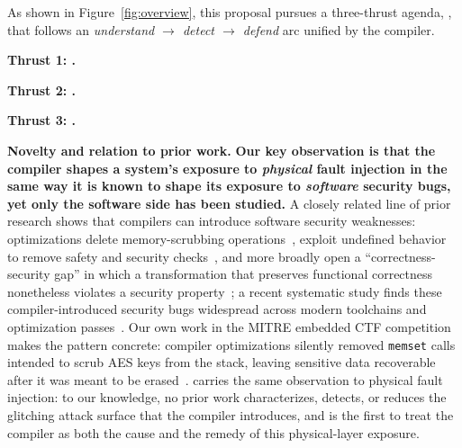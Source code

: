 As shown in Figure~\ref{fig:overview}, this proposal pursues a three-thrust agenda, \sysname, that follows an \emph{understand $\rightarrow$ detect $\rightarrow$ defend} arc unified by the compiler.

\noindent\textbf{Thrust 1: \thrustone.}

\noindent\textbf{Thrust 2: \thrusttwo.}

\noindent\textbf{Thrust 3: \thrustthree.}

\noindent\textbf{Novelty and relation to prior work.}
\textbf{Our key observation is that the compiler shapes a system's exposure to \emph{physical} fault injection in the same way it is known to shape its exposure to \emph{software} security bugs, yet only the software side has been studied.}
A closely related line of prior research shows that compilers can introduce software security weaknesses: optimizations delete memory-scrubbing operations~\cite{yang2017deadstore}, exploit undefined behavior to remove safety and security checks~\cite{wang2013undefined}, and more broadly open a ``correctness-security gap'' in which a transformation that preserves functional correctness nonetheless violates a security property~\cite{dsilva2015correctness}; a recent systematic study finds these compiler-introduced security bugs widespread across modern toolchains and optimization passes~\cite{xu2023silent}.
Our own work in the MITRE embedded CTF competition makes the pattern concrete: compiler optimizations silently removed \texttt{memset} calls intended to scrub AES keys from the stack, leaving sensitive data recoverable after it was meant to be erased~\cite{ma2025ectf}.
\sysname carries the same observation to physical fault injection: to our knowledge, no prior work characterizes, detects, or reduces the glitching attack surface that the compiler introduces, and \sysname is the first to treat the compiler as both the cause and the remedy of this physical-layer exposure.

